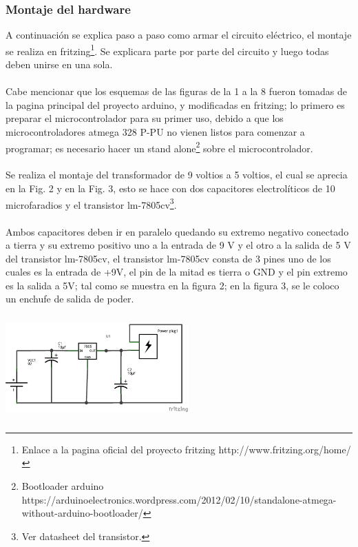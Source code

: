 \documentclass[12pt]{article}
\newenvironment{Figure}
{\par\medskip\noindent\minipage{\linewidth}}
{\endminipage\par\medskip}
\begin{document}
\begin{multicols}{2}
\subsubsection{Montaje del hardware}
A continuación se explica paso a paso como armar el circuito eléctrico, el montaje se realiza en fritzing\footnote{Enlace a la pagina oficial del proyecto fritzing http://www.fritzing.org/home/}. Se explicara parte por parte del circuito y luego todas deben unirse en una sola.
\\ \\
Cabe mencionar que los esquemas de las figuras de la 1 a la 8 fueron tomadas de la pagina principal del proyecto arduino, y modificadas en fritzing; lo primero es preparar el microcontrolador para su primer uso, debido a que los microcontroladores atmega 328 P-PU no vienen listos para comenzar a programar; es necesario hacer un stand alone\footnote{Bootloader arduino https://arduinoelectronics.wordpress.com/2012/02/10/standalone-atmega-without-arduino-bootloader/} sobre el microcontrolador.
\\ \\ 
Se realiza el montaje del transformador de 9 voltios a 5 voltios, el cual se aprecia en la Fig. 2 y en la Fig. 3, esto se hace con dos capacitores electrolíticos de 10 microfaradios  y el transistor lm-7805cv\footnote{ Ver datasheet del transistor.}.
\\ \\
Ambos  capacitores deben ir en paralelo quedando su extremo negativo conectado a tierra y su extremo positivo uno a la entrada de 9 V y el otro a la salida de 5 V del transistor lm-7805cv, el transistor lm-7805cv consta de 3 pines uno de los cuales es la entrada de +9V, el pin de la mitad es tierra o GND y el pin extremo es la salida a 5V; tal como se muestra en la figura 2; en la figura 3, se le coloco un enchufe de salida de poder.

\begin{Figure}
\center
\includegraphics[width=7cm, height=4cm]{fig/esquematrans.png} 
\label{fig:g2}
\end{Figure}


\end{multicols}
\end{document}
